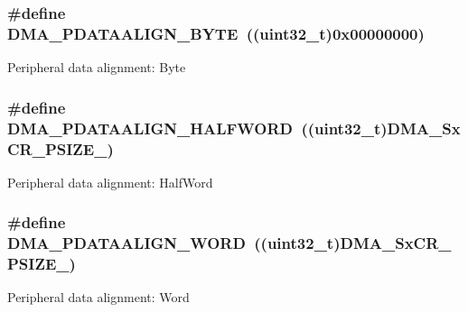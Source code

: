 \subsubsection[{\texorpdfstring{D\+M\+A\+\_\+\+P\+D\+A\+T\+A\+A\+L\+I\+G\+N\+\_\+\+B\+Y\+TE}{DMA_PDATAALIGN_BYTE}}]{\setlength{\rightskip}{0pt plus 5cm}\#define D\+M\+A\+\_\+\+P\+D\+A\+T\+A\+A\+L\+I\+G\+N\+\_\+\+B\+Y\+TE~((uint32\+\_\+t)0x00000000)}\hypertarget{group___d_m_a___peripheral__data__size_ga55b8c8f5ec95f10d26d6c5b1c9136730}{}\label{group___d_m_a___peripheral__data__size_ga55b8c8f5ec95f10d26d6c5b1c9136730}
Peripheral data alignment\+: Byte 
\subsubsection[{\texorpdfstring{D\+M\+A\+\_\+\+P\+D\+A\+T\+A\+A\+L\+I\+G\+N\+\_\+\+H\+A\+L\+F\+W\+O\+RD}{DMA_PDATAALIGN_HALFWORD}}]{\setlength{\rightskip}{0pt plus 5cm}\#define D\+M\+A\+\_\+\+P\+D\+A\+T\+A\+A\+L\+I\+G\+N\+\_\+\+H\+A\+L\+F\+W\+O\+RD~((uint32\+\_\+t)D\+M\+A\+\_\+\+Sx\+C\+R\+\_\+\+P\+S\+I\+Z\+E\+\_)}\hypertarget{group___d_m_a___peripheral__data__size_gac08bfd907442dba5358830b247135bcc}{}\label{group___d_m_a___peripheral__data__size_gac08bfd907442dba5358830b247135bcc}
Peripheral data alignment\+: Half\+Word 
\subsubsection[{\texorpdfstring{D\+M\+A\+\_\+\+P\+D\+A\+T\+A\+A\+L\+I\+G\+N\+\_\+\+W\+O\+RD}{DMA_PDATAALIGN_WORD}}]{\setlength{\rightskip}{0pt plus 5cm}\#define D\+M\+A\+\_\+\+P\+D\+A\+T\+A\+A\+L\+I\+G\+N\+\_\+\+W\+O\+RD~((uint32\+\_\+t)D\+M\+A\+\_\+\+Sx\+C\+R\+\_\+\+P\+S\+I\+Z\+E\+\_)}\hypertarget{group___d_m_a___peripheral__data__size_gaad50e97cbc4a726660db9c3f42ac93b0}{}\label{group___d_m_a___peripheral__data__size_gaad50e97cbc4a726660db9c3f42ac93b0}
Peripheral data alignment\+: Word 
